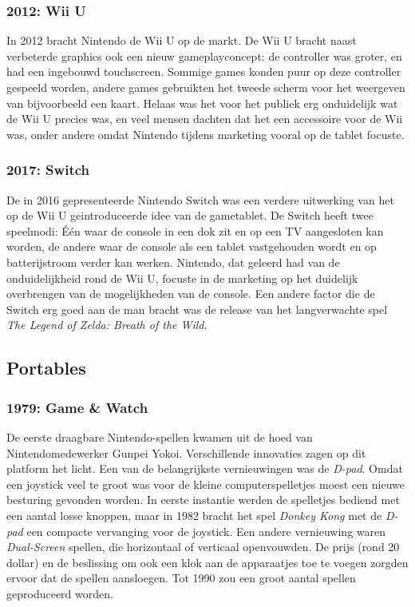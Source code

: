 \documentclass{article}
\begin{document}
\subsubsection{2012: Wii U}
In 2012 bracht Nintendo de Wii U op de markt. De Wii U bracht naast verbeterde graphics ook een nieuw gameplayconcept: de controller was groter, en had een ingebouwd touchscreen. Sommige games konden puur op deze controller gespeeld worden, andere games gebruikten het tweede scherm voor het weergeven van bijvoorbeeld een kaart. Helaas was het voor het publiek erg onduidelijk wat de Wii U precies was, en veel mensen dachten dat het een accessoire voor de Wii was, onder andere omdat Nintendo tijdens marketing vooral op de tablet focuste.

\subsubsection{2017: Switch}
De in 2016 gepresenteerde Nintendo Switch was een verdere uitwerking van het op de Wii U geintroduceerde idee van de gametablet. De Switch heeft twee speelmodi: \'E\'en waar de console in een dok zit en op een TV aangesloten kan worden, de andere waar de console als een tablet vastgehouden wordt en op batterijstroom verder kan werken. Nintendo, dat geleerd had van de onduidelijkheid rond de Wii U, focuste in de marketing op het duidelijk overbrengen van de mogelijkheden van de console. Een andere factor die de Switch erg goed aan de man bracht was de release van het langverwachte spel \textit{The Legend of Zelda: Breath of the Wild}.


\subsection{Portables}
\subsubsection{1979: Game \& Watch}
De eerste draagbare Nintendo-spellen kwamen uit de hoed van Nintendomedewerker Gunpei Yokoi. Verschillende innovaties zagen op dit platform het licht. Een van de belangrijkste vernieuwingen was de \textit{D-pad}. Omdat een joystick veel te groot was voor de kleine computerspelletjes moest een nieuwe besturing gevonden worden. In eerste instantie werden de spelletjes bediend met een aantal losse knoppen, maar in 1982 bracht het spel \textit{Donkey Kong} met de \textit{D-pad} een compacte vervanging voor de joystick. Een andere vernieuwing waren \textit{Dual-Screen} spellen, die horizontaal of verticaal openvouwden. De prijs (rond 20 dollar) en de beslissing om ook een klok aan de apparaatjes toe te voegen zorgden ervoor dat de spellen aansloegen. Tot 1990 zou een groot aantal spellen geproduceerd worden.
\end{document}
